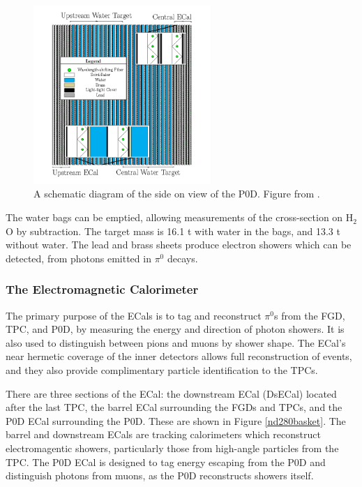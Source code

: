 \begin{figure}[!htbp]
\centering
\includegraphics*[width=0.6\textwidth,clip]{figs/podconstruction}
\caption{A schematic diagram of the side on view of the P0D. Figure from \cite{tript}.}\label{fig:podconstruction}
\end{figure}

The water bags can be emptied, allowing measurements of the cross-section on H$_2$O by subtraction. The target mass is 16.1 t with water in the bags, and 13.3 t without water. The lead and brass sheets produce electron showers which can be detected, from photons emitted in $\pi^0$ decays.

\subsubsection{The Electromagnetic Calorimeter}\label{sec:ecal}

The primary purpose of the ECals is to tag and reconstruct $\pi^0$s from the FGD, TPC, and P0D, by measuring the energy and direction of photon showers. It is also used to distinguish between pions and muons by shower shape. The ECal's near hermetic coverage of the inner detectors allows full reconstruction of events, and they also provide complimentary particle identification to the TPCs.

There are three sections of the ECal: the downstream ECal (DsECal) located after the last TPC, the barrel ECal surrounding the FGDs and TPCs, and the P0D ECal surrounding the P0D. These are shown in Figure \ref{nd280basket}. The barrel and downstream ECals are tracking calorimeters which reconstruct electromagentic showers, particularly those from high-angle particles from the TPC. The P0D ECal is designed to tag energy escaping from the P0D and distinguish photons from muons, as the P0D reconstructs showers itself.

